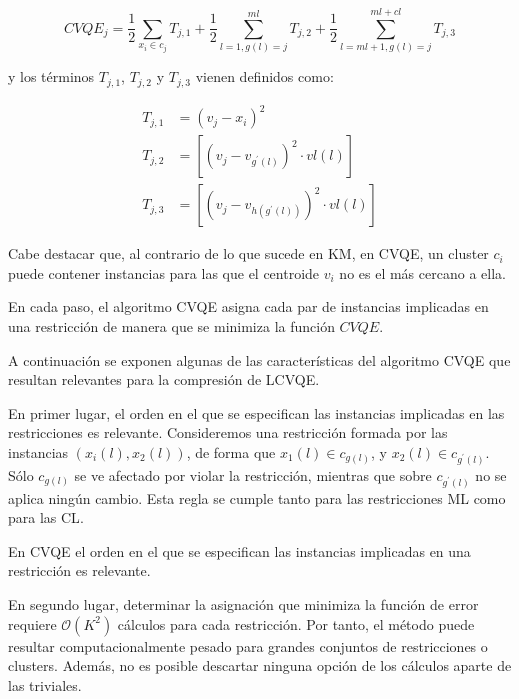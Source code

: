 \begin{equation}
CVQE_j = \frac{1}{2} \sum_{x_i \in c_j} T_{j,1} + 
\frac{1}{2} \sum_{l=1,g(l) = j}^{ml} T_{j,2} + 
\frac{1}{2} \sum_{l=ml + 1,g(l) = j}^{ml + cl} T_{j,3}
\label{eqn32}
\end{equation}

y los términos $T_{j,1}$, $T_{j,2}$ y $T_{j,3}$ vienen definidos como: 

\begin{equation}
\begin{split}
T_{j,1} &= (v_j - x_i)^2\\
T_{j,2} &= \left[ (v_j - v_{g^\prime(l)})^2 \cdot vl(l) \right]\\
T_{j,3} &= \left[ (v_j - v_{h(g^\prime(l))})^2 \cdot vl(l) \right]
\end{split}
\label{eqn33}
\end{equation}

Cabe destacar que, al contrario de lo que sucede en \acf{KM}, en \acs{CVQE}, un cluster $c_i$ puede contener instancias para las que el centroide $v_i$ no es el más cercano a ella.

En cada paso, el algoritmo \acs{CVQE} asigna cada par de instancias implicadas en una restricción de manera que se minimiza la función $CVQE$.

A continuación se exponen algunas de las características del algoritmo \acs{CVQE} que resultan relevantes para la compresión de \acs{LCVQE}.

En primer lugar, el orden en el que se especifican las instancias implicadas en las restricciones es relevante. Consideremos una restricción formada por las instancias $(x_i(l), x_2(l))$, de forma que $x_1(l) \in c_{g(l)}$, y $x_2(l) \in c_{g^\prime(l)}$. Sólo $c_{g(l)}$ se ve afectado por violar la restricción, mientras que sobre $c_{g^\prime(l)}$ no se aplica ningún cambio. Esta regla se cumple tanto para las restricciones \acf{ML} como para las \acf{CL}.

\begin{observacion}
	
	En \acs{CVQE} el orden en el que se especifican las instancias implicadas en una restricción es relevante.
	
\end{observacion}

En segundo lugar, determinar la asignación que minimiza la función de error requiere $\mathcal{O}(K^2)$ cálculos para cada restricción. Por tanto, el método puede resultar computacionalmente pesado para grandes conjuntos de restricciones o clusters. Además, no es posible descartar ninguna opción de los cálculos aparte de las triviales.

